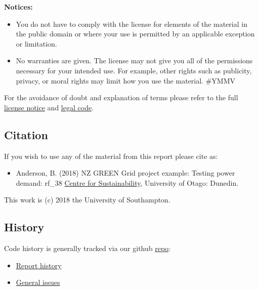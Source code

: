 \documentclass[]{article}
\providecommand{\tightlist}{%
  \setlength{\itemsep}{0pt}\setlength{\parskip}{0pt}}
\theoremstyle{definition}
\theoremstyle{definition}
\theoremstyle{definition}
\theoremstyle{remark}
\begin{document}
\textbf{Notices:}

\begin{itemize}
\tightlist
\item
  You do not have to comply with the license for elements of the
  material in the public domain or where your use is permitted by an
  applicable exception or limitation.
\item
  No warranties are given. The license may not give you all of the
  permissions necessary for your intended use. For example, other rights
  such as publicity, privacy, or moral rights may limit how you use the
  material. \#YMMV
\end{itemize}

For the avoidance of doubt and explanation of terms please refer to the
full \href{https://creativecommons.org/licenses/by-sa/4.0/}{license
notice} and
\href{https://creativecommons.org/licenses/by-sa/4.0/legalcode}{legal
code}.

\subsection{Citation}\label{citation}

If you wish to use any of the material from this report please cite as:

\begin{itemize}
\tightlist
\item
  Anderson, B. (2018) NZ GREEN Grid project example: Testing power
  demand: rf\_38
  \href{http://www.otago.ac.nz/centre-sustainability/}{Centre for
  Sustainability}, University of Otago: Dunedin.
\end{itemize}

This work is (c) 2018 the University of Southampton.

\subsection{History}\label{history}

Code history is generally tracked via our github
\href{https://github.com/dataknut/nzGREENGridDataR}{repo}:

\begin{itemize}
\tightlist
\item
  \href{https://github.com/dataknut/nzGREENGridDataR/commits/master/examples/testHouseholdPower.Rmd}{Report
  history}
\item
  \href{https://github.com/dataknut/nzGREENGridDataR/issues}{General
  issues}
\end{itemize}
\end{document}
